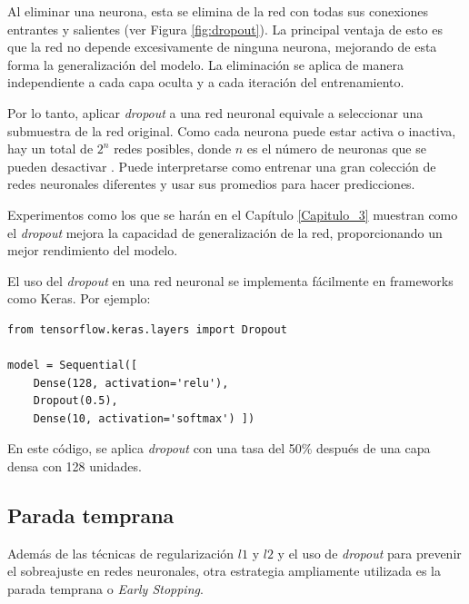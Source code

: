 Al eliminar una neurona, esta se elimina de la red con todas sus conexiones entrantes y salientes (ver Figura \ref{fig:dropout}). La principal ventaja de esto es que la red no depende excesivamente de ninguna neurona, mejorando de esta forma la generalización del modelo. La eliminación se aplica de manera independiente a cada capa oculta y a cada iteración del entrenamiento. 


Por lo tanto, aplicar \textit{dropout} a una red neuronal equivale a seleccionar una submuestra de la red original. Como cada neurona puede estar activa o inactiva, hay un total de $2^n$ redes posibles, donde $n$ es el número de neuronas que se pueden desactivar \citep{srivastava2013improving}. Puede interpretarse como entrenar una gran colección de redes neuronales diferentes y usar sus promedios para hacer predicciones.


Experimentos como los que se harán en el Capítulo \ref{Capitulo_3} muestran como el \textit{dropout} mejora la capacidad de generalización de la red, proporcionando un mejor rendimiento del modelo.


El uso del \textit{dropout} en una red neuronal se implementa fácilmente en frameworks como Keras. Por ejemplo:

\lstset{language=Python}
\begin{lstlisting}
from tensorflow.keras.layers import Dropout

model = Sequential([
    Dense(128, activation='relu'),
    Dropout(0.5),
    Dense(10, activation='softmax') ])
\end{lstlisting}

En este código, se aplica \textit{dropout} con una tasa del 50\% después de una capa densa con 128 unidades.


\subsection{Parada temprana}

Además de las técnicas de regularización $l1$ y $l2$ y el uso de \textit{dropout} para prevenir el sobreajuste en redes neuronales, otra estrategia ampliamente utilizada es la parada temprana o \textit{Early Stopping}.

